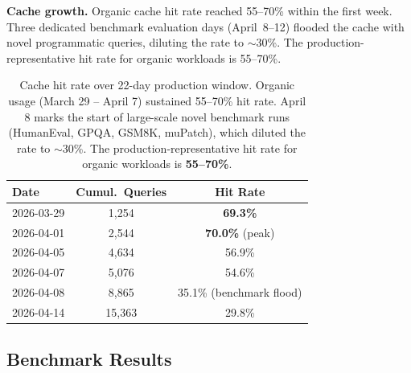 \documentclass[11pt]{article}
\begin{document}
\textbf{Cache growth.} Organic cache hit rate reached 55--70\% within
the first week. Three dedicated benchmark evaluation days (April~8--12)
flooded the cache with novel programmatic queries, diluting the rate to
$\sim$30\%. The production-representative hit rate for organic workloads
is 55--70\%.

\begin{table}[t]
\centering
\small
\begin{tabular}{lcc}
\toprule
\textbf{Date} & \textbf{Cumul.\ Queries} & \textbf{Hit Rate} \\
\midrule
2026-03-29 & 1,254 & \textbf{69.3\%} \\
2026-04-01 & 2,544 & \textbf{70.0\%} (peak) \\
2026-04-05 & 4,634 & 56.9\% \\
2026-04-07 & 5,076 & 54.6\% \\
2026-04-08 & 8,865 & 35.1\% (benchmark flood) \\
2026-04-14 & 15,363 & 29.8\% \\
\bottomrule
\end{tabular}
\caption{Cache hit rate over 22-day production window. Organic usage
(March 29 -- April 7) sustained 55--70\% hit rate. April 8 marks the
start of large-scale novel benchmark runs (HumanEval, GPQA, GSM8K,
muPatch), which diluted the rate to $\sim$30\%. The
production-representative hit rate for organic workloads is
\textbf{55--70\%}.}
\label{tab:cachegrowth}
\end{table}

\subsection{Benchmark Results}
\label{sec:benchmarks}
\end{document}
